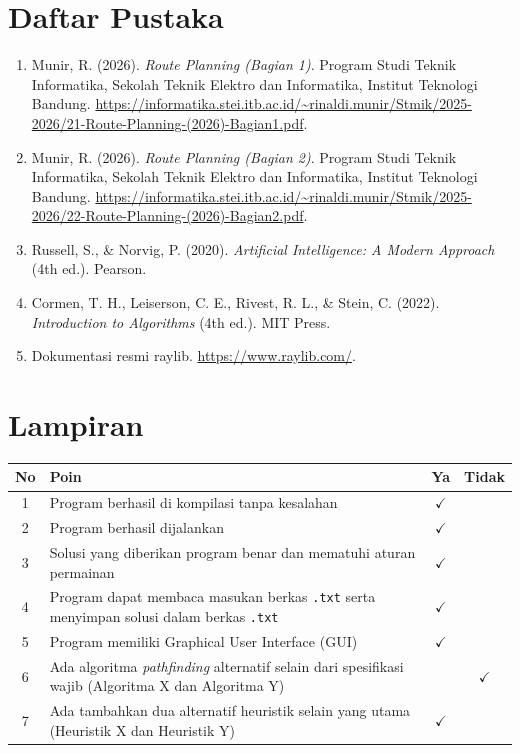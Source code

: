 \documentclass[a4paper,11pt]{article}
\begin{document}
\section{Daftar Pustaka}
\begin{enumerate}
    \item Munir, R. (2026). \textit{Route Planning (Bagian 1)}. Program Studi Teknik Informatika, Sekolah Teknik Elektro dan Informatika, Institut Teknologi Bandung. \url{https://informatika.stei.itb.ac.id/~rinaldi.munir/Stmik/2025-2026/21-Route-Planning-(2026)-Bagian1.pdf}.
    \item Munir, R. (2026). \textit{Route Planning (Bagian 2)}. Program Studi Teknik Informatika, Sekolah Teknik Elektro dan Informatika, Institut Teknologi Bandung. \url{https://informatika.stei.itb.ac.id/~rinaldi.munir/Stmik/2025-2026/22-Route-Planning-(2026)-Bagian2.pdf}.
    \item Russell, S., \& Norvig, P. (2020). \textit{Artificial Intelligence: A Modern Approach} (4th ed.). Pearson.
    \item Cormen, T. H., Leiserson, C. E., Rivest, R. L., \& Stein, C. (2022). \textit{Introduction to Algorithms} (4th ed.). MIT Press.
    \item Dokumentasi resmi raylib. \url{https://www.raylib.com/}.
\end{enumerate}

\newpage
\section{Lampiran}

\begin{table}[H]
    \centering
    \renewcommand{\arraystretch}{1.5}
    \begin{tabular}{|c|p{9.5cm}|c|c|}
        \hline
        \textbf{No} & \textbf{Poin} & \textbf{Ya} & \textbf{Tidak} \\
        \hline
        1 & Program berhasil di kompilasi tanpa kesalahan & $\checkmark$ &  \\
        \hline
        2 & Program berhasil dijalankan & $\checkmark$ &  \\
        \hline
        3 & Solusi yang diberikan program benar dan mematuhi aturan permainan & $\checkmark$ &  \\
        \hline
        4 & Program dapat membaca masukan berkas \texttt{.txt} serta menyimpan solusi dalam berkas \texttt{.txt} & $\checkmark$ &  \\
        \hline
        5 & Program memiliki Graphical User Interface (GUI) & $\checkmark$ &  \\
        \hline
        6 & Ada algoritma \textit{pathfinding} alternatif selain dari spesifikasi wajib (Algoritma X dan Algoritma Y) &  & $\checkmark$ \\
        \hline
        7 & Ada tambahkan dua alternatif heuristik selain yang utama (Heuristik X dan Heuristik Y) & $\checkmark$ &  \\
        \hline
    \end{tabular}
\end{table}
\end{document}
